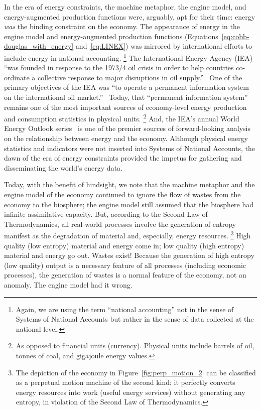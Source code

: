 In the era of energy constraints, 
the machine metaphor, 
the engine model, 
and energy-augmented production functions 
were, arguably, apt for their time:
energy \emph{was} the binding constraint on the economy.
The appearance of energy in the engine model and
energy-augmented production functions 
(Equations~\ref{eq:cobb-douglas_with_energy} and~\ref{eq:LINEX})
was mirrored by international efforts 
to include energy in national accounting.%
	\footnote{
	Again, we are using the term ``national accounting''
	not in the sense of Systems of National Accounts 
	but rather in the sense of data collected
	at the national level.
	}
The International Energy Agency (IEA) 
``was founded in response to the 1973/4 oil crisis 
in order to help countries co-ordinate a collective response 
to major disruptions in oil supply.''~\cite{International-Energy-Agency:2014aa}
One of the primary objectives of the IEA was
``to operate a permanent information system 
on the international oil market.''~\cite{International-Energy-Agency:2014aa}
Today, that ``permanent information system''~\cite{International-Energy-Agency:2014ab}
remains one of the most important 
sources of economy-level energy production and consumption
statistics in physical units.%
	\footnote{
	As opposed to financial units (currency).
	Physical units include barrels of oil, tonnes of coal, and gigajoule energy values.
	}
And, the IEA's annual World Energy Outlook 
series~\cite{International-Energy-Agency:2014ac} is 
one of the premier sources
of forward-looking analysis on the relationship between energy and the economy.
Although physical energy statistics and indicators
were not inserted into Systems of National Accounts,
the dawn of the era of energy constraints provided the impetus 
for gathering and disseminating the world's energy data.

Today, with the benefit of hindsight, 
we note that the machine metaphor and the engine model of the economy
continued to ignore the flow of wastes from the economy to the biosphere;
the engine model still assumed that the biosphere had infinite assimilative capacity.
But, according to the Second Law of Thermodynamics, 
all real-world processes involve 
the generation of entropy
manifest as the degradation 
of material and, especially, energy resources.%
	\footnote{
	The depiction of the economy in Figure~\ref{fig:perp_motion_2} 
	can be classified as a perpetual motion machine of the second kind: 
	it perfectly converts energy resources into work (useful energy services) 
	without generating any entropy, 
	in violation of the Second Law of Thermodynamics. 	
	}
High quality (low entropy) material and energy come in; 
low quality (high entropy) material and energy go out. 
Wastes exist!
Because the generation of high entropy (low quality) output 
is a necessary feature of all processes (including economic processes), 
the generation of wastes is a normal feature of the economy, 
not an anomaly. 
The engine model had it wrong.


